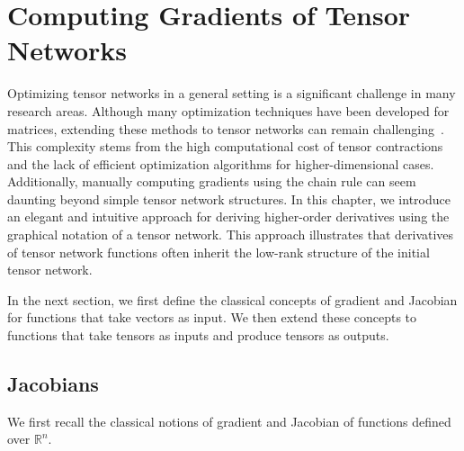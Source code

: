 \section{Computing Gradients of Tensor Networks}\label{chapter:gradients}
Optimizing tensor networks in a general setting is a significant challenge in many research areas. Although many optimization techniques have been developed for matrices, extending these methods to tensor networks can remain challenging~\citep{liao2019differentiable}. This complexity stems from the high computational cost of tensor contractions and the lack of efficient optimization algorithms for higher-dimensional cases. Additionally, manually computing gradients using the chain rule can seem daunting beyond simple tensor network structures. In this chapter, we introduce an elegant and intuitive approach for deriving higher-order derivatives using the graphical notation of a tensor network. This approach illustrates that derivatives of tensor network functions often inherit the low-rank structure of the initial tensor network.

In the next section, we first define the classical concepts of gradient and Jacobian for functions that take vectors as input. We then extend these concepts to functions that take tensors as inputs and produce tensors as outputs.
\subsection{Jacobians}
We first recall the classical notions of gradient and Jacobian of functions defined over $\mathbb{R}^n$.

